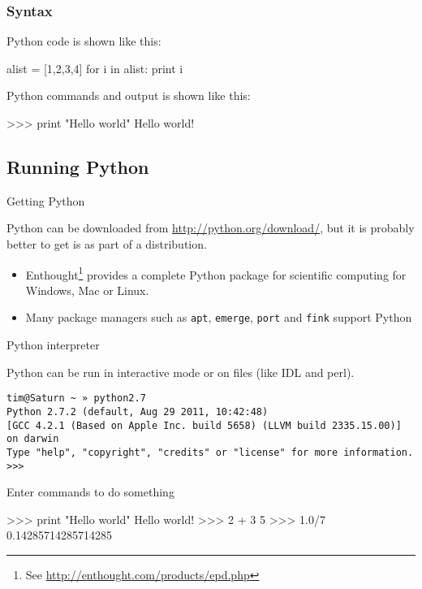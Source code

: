 \documentclass[xetex,10pt]{beamer}
\def\spacer{\vspace*{1em}}
\begin{document}
\begin{frame}[fragile]
	\frametitle{Syntax}
	
	Python code is shown like this:
\begin{python}
alist = [1,2,3,4]
for i in alist:
    print i
\end{python}
	
	\spacer
	
	Python commands and output is shown like this:

\begin{python}
>>> print "Hello world"
Hello world!
\end{python}

\end{frame}

\subsection{Running Python}

\begin{frame}[fragile]{Getting Python}
	
	Python can be downloaded from \url{http://python.org/download/}, but it is probably better to get is as part of a distribution.

	\spacer

	\begin{itemize}
		\item Enthought\footnote[frame]{See \url{http://enthought.com/products/epd.php}} provides a complete Python package for scientific computing for Windows, Mac or Linux.
		\item Many package managers such as \verb!apt!, \verb!emerge!, \verb!port! and \verb!fink! support Python
	\end{itemize}
	
\end{frame}

\begin{frame}[fragile]{Python interpreter}
	
	Python can be run in interactive mode or on files (like IDL and perl).
	
\begin{verbatim}
tim@Saturn ~ » python2.7
Python 2.7.2 (default, Aug 29 2011, 10:42:48) 
[GCC 4.2.1 (Based on Apple Inc. build 5658) (LLVM build 2335.15.00)] on darwin
Type "help", "copyright", "credits" or "license" for more information.
>>> 
\end{verbatim}

Enter commands to do something

\begin{python}
>>> print "Hello world"
Hello world!
>>> 2 + 3
5
>>> 1.0/7
0.14285714285714285
\end{python}

\end{frame}
\end{document}
